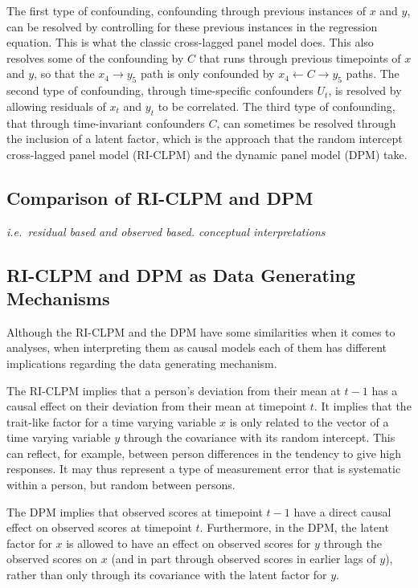 \documentclass[
]{interact}
\begin{document}
The first type of confounding, confounding through previous instances of
\(x\) and \(y\), can be resolved by controlling for these previous
instances in the regression equation. This is what the classic
cross-lagged panel model does. This also resolves some of the
confounding by \(C\) that runs through previous timepoints of \(x\) and
\(y\), so that the \(x_4 \rightarrow y_5\) path is only confounded by
\(x_4 \leftarrow C \rightarrow y_5\) paths. The second type of
confounding, through time-specific confounders \(U_t\), is resolved by
allowing residuals of \(x_t\) and \(y_t\) to be correlated. The third
type of confounding, that through time-invariant confounders \(C\), can
sometimes be resolved through the inclusion of a latent factor, which is
the approach that the random intercept cross-lagged panel model
(RI-CLPM) and the dynamic panel model (DPM) take.

\hypertarget{comparison-of-ri-clpm-and-dpm}{%
\subsection{Comparison of RI-CLPM and
DPM}\label{comparison-of-ri-clpm-and-dpm}}

\emph{i.e.~residual based and observed based. conceptual
interpretations}

\hypertarget{ri-clpm-and-dpm-as-data-generating-mechanisms}{%
\subsection{RI-CLPM and DPM as Data Generating
Mechanisms}\label{ri-clpm-and-dpm-as-data-generating-mechanisms}}

Although the RI-CLPM and the DPM have some similarities when it comes to
analyses, when interpreting them as causal models each of them has
different implications regarding the data generating mechanism.

The RI-CLPM implies that a person's deviation from their mean at \(t-1\)
has a causal effect on their deviation from their mean at timepoint
\(t\). It implies that the trait-like factor for a time varying variable
\(x\) is only related to the vector of a time varying variable \(y\)
through the covariance with its random intercept. This can reflect, for
example, between person differences in the tendency to give high
responses. It may thus represent a type of measurement error that is
systematic within a person, but random between persons.

The DPM implies that observed scores at timepoint \(t-1\) have a direct
causal effect on observed scores at timepoint \(t\). Furthermore, in the
DPM, the latent factor for \(x\) is allowed to have an effect on
observed scores for \(y\) through the observed scores on \(x\) (and in
part through observed scores in earlier lags of \(y\)), rather than only
through its covariance with the latent factor for \(y\).
\end{document}
